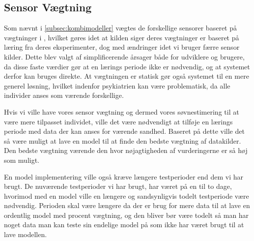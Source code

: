 \subsection{Sensor Vægtning}
Som nævnt i \cref{subsec:kombimodeller} vægtes de forskellige sensorer baseret på vægtninger i \citet{6563918}, hvilket gøres idet at kilden siger deres vægtninger er baseret på læring fra deres eksperimenter, dog med ændringer idet vi bruger færre sensor kilder.
Dette blev valgt af simplificerende årsager både for udviklere og brugere, da disse faste værdier gør at en lærings periode ikke er nødvendig, og at systemet derfor kan bruges direkte.
At vægtningen er statisk gør også systemet til en mere generel løsning, hvilket indenfor psykiatrien kan være problematisk, da alle individer anses som værende forskellige.

Hvis vi ville have vores sensor vægtning og dermed vores søvnestimering til at være mere tilpasset individet, ville det være nødvendigt at tilføje en lærings periode med data der kan anses for værende sandhed.
Baseret på dette ville det så være muligt at lave en model til at finde den bedste vægtning af datakilder.
Den bedste vægtning værende den hvor nøjagtigheden af vurderingerne er så høj som muligt.

En model implementering ville også kræve længere testperioder end dem vi har brugt.
De nuværende testperioder vi har brugt, har været på en til to dage, hvorimod med en model ville en længere og sandsynligvis todelt testperiode være nødvendig.
Perioden skal være længere da der er brug for mere data til at lave en ordentlig model med procent vægtning, og den bliver bør være todelt så man har noget data man kan teste sin endelige model på som ikke har været brugt til at lave modellen.
